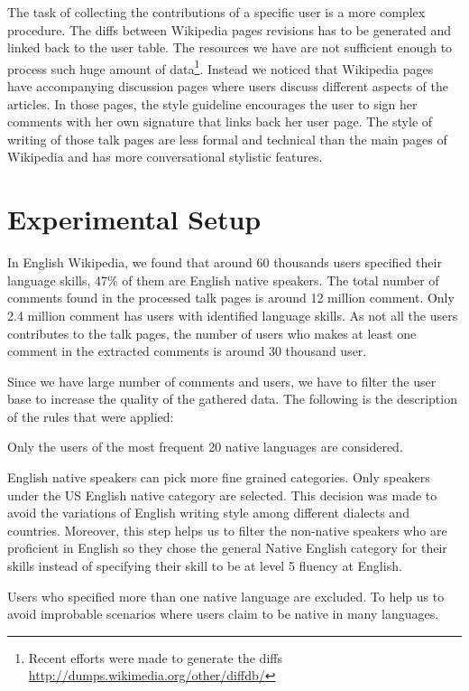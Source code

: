 \documentclass[10pt,a5paper,twoside]{article}
\begin{document}
The task of collecting the contributions of a specific user is a more complex
procedure. The diffs between Wikipedia pages revisions has to be generated and
linked back to the user table. The resources we have are not sufficient enough to process such
huge amount of data\footnote{Recent efforts were
made to generate the diffs \url{http://dumps.wikimedia.org/other/diffdb/}}.
Instead we noticed that Wikipedia pages have accompanying discussion pages where
users discuss different aspects of the articles. In those pages, the style
guideline encourages the user to sign her comments with her own signature that
links back her user page. The style of writing of those
talk pages are less formal and technical than the main pages of Wikipedia and has more conversational stylistic features.

\section{Experimental Setup}
\label{setup}
In English Wikipedia, we found that around 60 thousands users specified their language skills, 47\% of
them are English native speakers. The total number of comments found in the
processed talk pages is around 12 million comment. Only 2.4 million comment has users with identified language skills. As not all the users contributes to the talk pages, the number of users who makes at least one comment in the extracted comments is around 30 thousand user.

Since we have large number of comments and users, we have to filter the user
base to increase the quality of the gathered data. The following is the
description of the rules that were applied:
\begin{compactitem}
\item Only the users of the most frequent 20 native languages are considered.
\item English native speakers can pick more fine grained categories. Only
  speakers under the US English native category are selected. This decision was made to avoid the
  variations of English writing style among different dialects and countries. Moreover,
  this step helps us to filter the non-native speakers who are proficient in
  English so they chose the general Native English category for their skills
  instead of specifying their skill to be at level 5 fluency at English.
\item Users who specified more than one native language are excluded. To help
  us to avoid improbable scenarios where users claim to be native in many
languages.
\end{compactitem}
\end{document}
